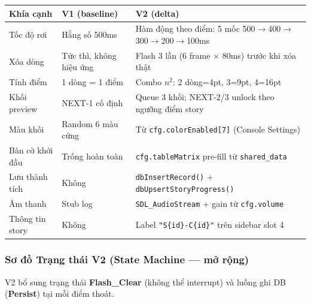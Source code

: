 \documentclass[12pt,a4paper]{article}
\begin{document}
\begin{tabularx}{\linewidth}{|l|X|X|}
    \hline
    \textbf{Khía cạnh} & \textbf{V1 (baseline)} & \textbf{V2 (delta)} \\
    \hline
    Tốc độ rơi & Hằng số 500ms & \shortstack[l]{Hàm động theo điểm:\\[0pt]5 mốc 500$\rightarrow$400$\rightarrow$300$\rightarrow$200$\rightarrow$100ms} \\
    \hline
    Xóa dòng & Tức thì, không hiệu ứng & Flash 3 lần (6 frame × 80ms) trước khi xóa thật \\
    \hline
    Tính điểm & 1 dòng = 1 điểm & Combo $n^2$: 2 dòng=4pt, 3=9pt, 4=16pt \\
    \hline
    Khối preview & NEXT-1 cố định & Queue 3 khối; NEXT-2/3 unlock theo ngưỡng điểm story \\
    \hline
    Màu khối & Random 6 màu cứng & Từ \texttt{cfg.colorEnabled[7]} (Console Settings) \\
    \hline
    Bàn cờ khởi đầu & Trống hoàn toàn & \texttt{cfg.tableMatrix} pre-fill từ \texttt{shared\_data} \\
    \hline
    Lưu thành tích & Không & \texttt{dbInsertRecord()} + \texttt{dbUpsertStoryProgress()} \\
    \hline
    Âm thanh & Stub log & \texttt{SDL\_AudioStream} + gain từ \texttt{cfg.volume} \\
    \hline
    Thông tin story & Không & Label \texttt{"S\{id\}-C\{id\}"} trên sidebar slot 4 \\
    \hline
\end{tabularx}

\subsubsection{Sơ đồ Trạng thái V2 (State Machine — mở rộng)}

\noindent V2 bổ sung trạng thái \textbf{Flash\_Clear} (không thể interrupt) và luồng ghi DB (\textbf{Persist}) tại mỗi điểm thoát.
\end{document}
